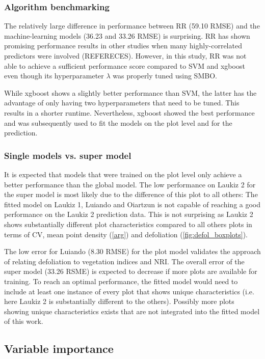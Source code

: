 \documentclass[review]{elsarticle}
\begin{document}
\subsubsection{Algorithm benchmarking}

The relatively large difference in performance between RR (59.10 RMSE) and the machine-learning models (36.23 and 33.26 RMSE) is surprising.
RR has shown promising performance results in other studies when many highly-correlated predictors were involved (REFERECES).
However, in this study, RR was not able to achieve a sufficient performance score compared to SVM and xgboost even though its hyperparameter $\lambda$ was properly tuned using SMBO.

While xgboost shows a slightly better performance than SVM, the latter has the advantage of only having two hyperparameters that need to be tuned.
This results in a shorter runtime.
Nevertheless, xgboost showed the best performance and was subsequently used to fit the models on the plot level and for the prediction.

\subsubsection{Single models vs. super model}

It is expected that models that were trained on the plot level only achieve a better performance than the global model.
The low performance on Laukiz 2 for the super model is most likely due to the difference of this plot to all others: The fitted model on Laukiz 1, Luiando and Oiartzun is not capable of reaching a good performance on the Laukiz 2 prediction data.
This is not surprising as Laukiz 2 shows substantially different plot characteristics compared to all others plots in terms of CV, mean point density (\autoref{arg}) and defoliation (\autoref{fig:defol_boxplots}).

The low error for Luiando (8.30 RMSE) for the plot model validates the approach of relating defoliation to vegetation indices and NRI.
The overall error of the super model (33.26 RSME) is expected to decrease if more plots are available for training.
To reach an optimal performance, the fitted model would need to include at least one instance of every plot that shows unique characteristics (i.e. here Laukiz 2 is substantially different to the others).
Possibly more plots showing unique characteristics exists that are not integrated into the fitted model of this work.

\subsection{Variable importance}
\end{document}
